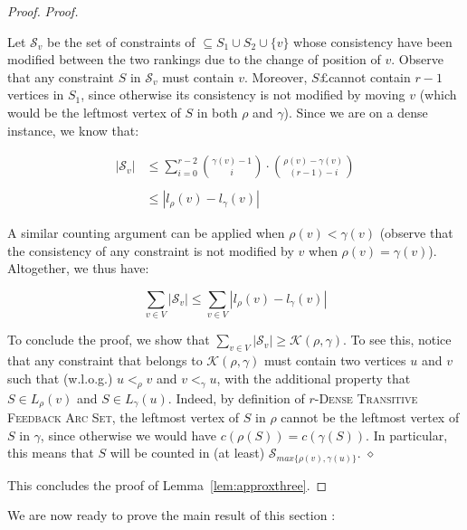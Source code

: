 \documentclass[11pt]{article}
\newenvironment{proofclaim}{
	\noindent \emph{Proof.}
}{\hfill $\diamond$ \\
}
\newcommand{\rFAST}{\textsc{$r$-Dense Transitive Feedback Arc Set}}
\begin{document}
\begin{proof}
\begin{proofclaim}
	Let $\mathcal{S}_v$ be the set of constraints of $\subseteq S_1 \cup S_2 \cup \{v\}$ whose consistency have been modified between the two rankings due to the change of position of $v$. Observe that any constraint $S$ in $\mathcal{S}_v$ must contain $v$. Moreover, $S£$cannot contain $r - 1$ vertices in $S_1$, since otherwise its consistency is not modified by moving $v$ (which would be the leftmost vertex of $S$ in both $\rho$ and $\gamma$). Since we are on a dense instance, we know that: 
	
	$$
		\begin{array}{ll}
		|\mathcal{S}_v| & \leqslant \displaystyle\sum_{i=0}^{r-2}  { \gamma(v) - 1 \choose i }  \cdot { \rho(v) - \gamma(v) \choose (r - 1) - i } \\
			& \\
						& \leqslant |l_\rho(v) - l_\gamma(v)|
		\end{array}
	$$
	
	A similar counting argument can be applied when $\rho(v) < \gamma(v)$ (observe that the consistency of any constraint is not modified by $v$ when $\rho(v) = \gamma(v)$). Altogether, we thus have: 
	
	$$
		\sum_{v \in V} |\mathcal{S}_v| \leqslant \displaystyle{\displaystyle\sum_{v \in V}} |l_\rho(v) - l_\gamma(v)|
	$$
	
	To conclude the proof, we show that $\sum_{v \in V} |\mathcal{S}_v| \geqslant \mathcal{K}(\rho, \gamma)$. To see this, notice that any constraint that belongs to $\mathcal{K}(\rho, \gamma)$ must contain two vertices $u$ and $v$ such that (w.l.o.g.) $u <_\rho v$ and $v <_\gamma u$, with the additional property that $S \in L_{\rho}(v)$ and $S \in L_\gamma(u)$. Indeed, by definition of \rFAST{}, the leftmost vertex of $S$ in $\rho$ cannot be the leftmost vertex of $S$ in $\gamma$, since otherwise we would have $c(\rho(S)) = c(\gamma(S))$. In particular, this means that $S$ will be counted in (at least) $\mathcal{S}_{max\{\rho(v), \gamma(u)\}}$. 
\end{proofclaim}

This concludes the proof of Lemma~\ref{lem:approxthree}.
 \end{proof}

We are now ready to prove the main result of this section :\\
\end{document}
